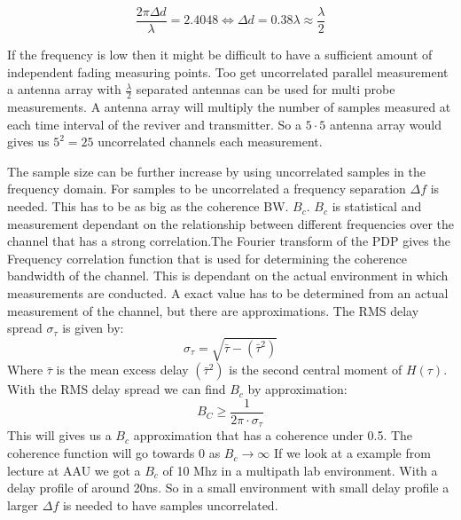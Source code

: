 \begin{equation}
\frac{2\pi \Delta d}{\lambda} = 2.4048 \Leftrightarrow \Delta d = 0.38 \lambda \approx \frac{\lambda}{2}
\end{equation}

If the frequency is low then it might be difficult to have a sufficient amount of independent fading measuring points. \citep[p.11]{UWMeasurement} Too get uncorrelated  parallel measurement a antenna array with $\frac{\lambda}{2}$ separated antennas can be used for multi probe measurements. A antenna array will multiply the number of samples measured at each time interval of the reviver and transmitter. So a $5\cdot 5$ antenna array would gives us $5^2 = 25$ uncorrelated channels each measurement.




The sample size can be further increase by using uncorrelated samples in the frequency domain. 
For samples to be uncorrelated a frequency separation $\Delta f$  is needed. This has to be as big as the coherence BW. $B_{c}$. $B_{c}$ is statistical and measurement dependant on the relationship between different frequencies over the channel that has a strong correlation.The Fourier transform of the PDP gives the Frequency correlation function that is used for determining the coherence bandwidth of the channel. This is dependant on the actual environment in which measurements are conducted. A exact value has to be determined from  an actual measurement of the channel, but there are approximations\citep{RayFadeHandbook}. The RMS delay spread $\sigma_{\tau}$ is given by:
\begin{equation}
\sigma_{\tau} = \sqrt{\bar{\tau} - {(\bar{\tau}^{2})}}
\end{equation}
Where $\bar{\tau}$ is the mean excess delay $(\bar{\tau}^{2})$ is 
the second central moment of $H(\tau)$. With the RMS delay spread we can find $B_c$ by approximation:
\begin{equation}
B_C \geq \frac{1}{2\pi \cdot \sigma_{\tau}}
\label{CohBW}
\end{equation}
This will gives us a $B_c$ approximation that has a coherence under 0.5. The coherence function will go towards 0 as $B_c  \rightarrow \infty $
\citep{CohBW}
If we look at a example from lecture at AAU we got a $B_c$ of 10 Mhz in a multipath lab environment.
 With a delay profile of around 20ns. So in a small environment with small delay profile a larger $\Delta f$ is needed to have samples uncorrelated.
\citep[Chapter 18.5]{ComHandbook}

